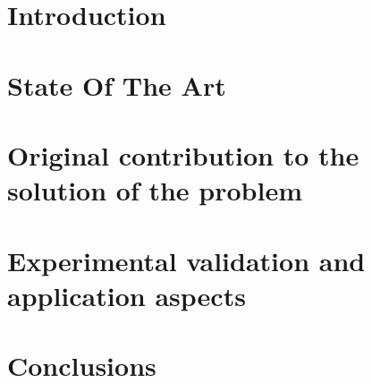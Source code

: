 \documentclass[a4paper, 12pt, oneside, hidelinks]{book}
\begin{document}

\tableofcontents
\clearpage
\sloppy
{}


\chapter{Introduction}


\chapter{State Of The Art}


\chapter{Original contribution to the solution of the problem}


\chapter{Experimental validation and application aspects}




\chapter{Conclusions}




\clearpage
\listoffigures
{}

\clearpage
\listoftables
{}

\clearpage




\clearpage
\end{document}
